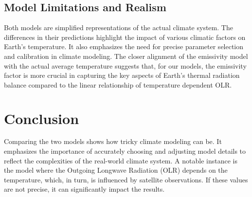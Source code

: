 \documentclass[12pt]{article}
\begin{document}
\subsection{Model Limitations and Realism}
Both models are simplified representations of the actual climate system. The differences in their predictions highlight the impact of various climatic factors on Earth's temperature. It also emphasizes the need for precise parameter selection and calibration in climate modeling. The closer alignment of the emissivity model with the actual average temperature suggests that, for our models, the emissivity factor is more crucial in capturing the key aspects of Earth's thermal radiation balance compared to the linear relationship of temperature dependent OLR.

\section{Conclusion}
Comparing the two models shows how tricky climate modeling can be. It emphasizes the importance of accurately choosing and adjusting model details to reflect the complexities of the real-world climate system. A notable instance is the model where the Outgoing Longwave Radiation (OLR) depends on the temperature, which, in turn, is influenced by satellite observations. If these values are not precise, it can significantly impact the results.

\newpage


\end{document}
